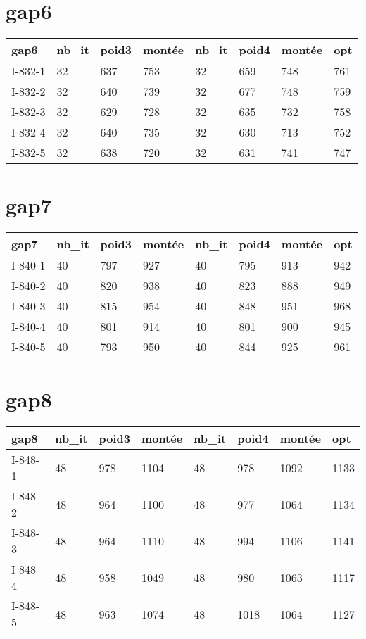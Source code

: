 \documentclass[a4paper,12pt,titlepage]{report}
\begin{document}
\section{gap6}

\begin{tabular}{|l|l|l|l|l|l|l|l|}
  \hline
  gap6 & nb\_it & poid3 & montée & nb\_it & poid4 & montée & opt \\
  \hline
  I-832-1 & 32 & 637 & 753 & 32 & 659 & 748 & 761  \\
  I-832-2 & 32 & 640 & 739 & 32 & 677 & 748 & 759  \\
  I-832-3 & 32 & 629 & 728 & 32 & 635 & 732 & 758  \\
  I-832-4 & 32 & 640 & 735 & 32 & 630 & 713 & 752  \\
  I-832-5 & 32 & 638 & 720 & 32 & 631 & 741 & 747  \\
  \hline
\end{tabular}

\section{gap7}

\begin{tabular}{|l|l|l|l|l|l|l|l|}
  \hline
  gap7 & nb\_it & poid3 & montée & nb\_it & poid4 & montée & opt \\
  \hline
  I-840-1 & 40 & 797 & 927 & 40 & 795 & 913 & 942  \\
  I-840-2 & 40 & 820 & 938 & 40 & 823 & 888 & 949  \\
  I-840-3 & 40 & 815 & 954 & 40 & 848 & 951 & 968  \\
  I-840-4 & 40 & 801 & 914 & 40 & 801 & 900 & 945  \\
  I-840-5 & 40 & 793 & 950 & 40 & 844 & 925 & 961  \\
  \hline
\end{tabular}

\section{gap8}

\begin{tabular}{|l|l|l|l|l|l|l|l|}
  \hline
  gap8 & nb\_it & poid3 & montée & nb\_it & poid4 & montée & opt \\
  \hline
  I-848-1 & 48 & 978 & 1104 & 48 & 978 & 1092 & 1133  \\
  I-848-2 & 48 & 964 & 1100 & 48 & 977 & 1064 & 1134  \\
  I-848-3 & 48 & 964 & 1110 & 48 & 994 & 1106 & 1141  \\
  I-848-4 & 48 & 958 & 1049 & 48 & 980 & 1063 & 1117  \\
  I-848-5 & 48 & 963 & 1074 & 48 & 1018 & 1064 & 1127  \\
  \hline
\end{tabular}
\end{document}
